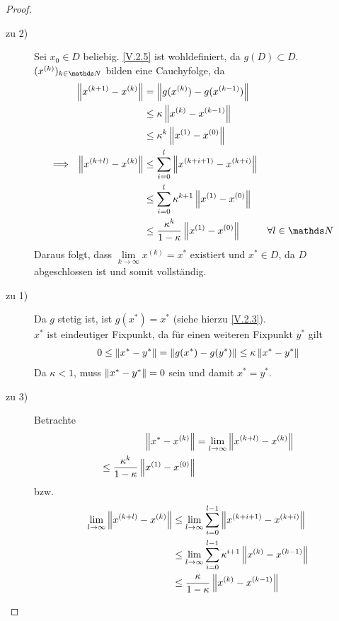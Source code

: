 \begin{proof}
  \begin{description}
  \item[zu 2)] Sei $x_0\in D$ beliebig. \eqref{V.2.5} ist wohldefiniert, da $g(D)\subset D$.
    $(x^{(k)})_{k\in\N}$ bilden eine Cauchyfolge, da 
    \begin{align*}
      \nn[x^{(k+1)}-x^{(k)}] &= \nn[g(x^{(k)})-g(x^{(k-1)})] \\
                             &\leq \kappa \nn[x^{(k)}-x^{(k-1)}] \\
                             &\leq \kappa^k\nn[x^{(1)}-x^{(0)}] \\
      \Longrightarrow~~ \nn[x^{(k+l)}-x^{(k)}] &\leq \sum_{i=0}^{l}\nn[x^{(k+i+1)}-x^{(k+i)}] \\
                             &\leq \sum_{i=0}^{l}\kappa^{k+1}\nn[x^{(1)}-x^{(0)}]\\
                             &\leq \frac{\kappa^k}{1-\kappa}\nn[x^{(1)}-x^{(0)}]
                             &&\forall l\in\N 
    \end{align*}
    Daraus folgt, dass $\lim\limits_{k\rightarrow \infty} x^{(k)}=x^{*} $ existiert 
    und $x^{*}\in D$, da $D$ abgeschlossen ist und somit vollständig.
    
  \item[zu 1)] Da $g$ stetig ist, ist $g(x^{*})=x^{*}$ (siehe hierzu \eqref{V.2.3}). \\
    $x^{*}	$ ist eindeutiger Fixpunkt, da für einen weiteren Fixpunkt $y^{*}$ gilt
    \begin{gather*}
      0\leq \nn[x^{*}-y^{*}] = \nn[g(x^{*})-g(y^{*})]\leq \kappa \nn[x^{*}-y^{*}]
    \end{gather*}
    Da $\kappa<1$, muss $ \nn[x^{*}-y^{*}]=0$ sein und damit $x^{*}=y^{*}$.
    
  \item[zu 3)] Betrachte 
    \begin{align*}
      \nn[x^{*}-x^{(k)}] &= \lim\limits_{l\rightarrow \infty} \nn[x^{(k+l)}-x^{(k)}] \\
      \leq  \frac{\kappa^k}{1-\kappa} \nn[x^{(1)}- x^{(0)}]
    \end{align*}
    bzw.
    \begin{align*}
      \lim\limits_{l\rightarrow \infty} \nn[x^{(k+l)}-x^{(k)}]
      &\leq \lim\limits_{l\rightarrow \infty} \sum_{i=0}^{l-1}\nn[x^{(k+i+1)}-x^{(k+i)}] \\
      &\leq \lim\limits_{l\rightarrow \infty}\sum_{i=0}^{l-1}\kappa^{i+1} \nn[x^{(k)}-x^{(k-1)}] \\
      &\leq \frac{\kappa}{1-\kappa} \nn[x^{(k)}-x^{(k-1)}] 
    \end{align*}
  \end{description}
\end{proof}

